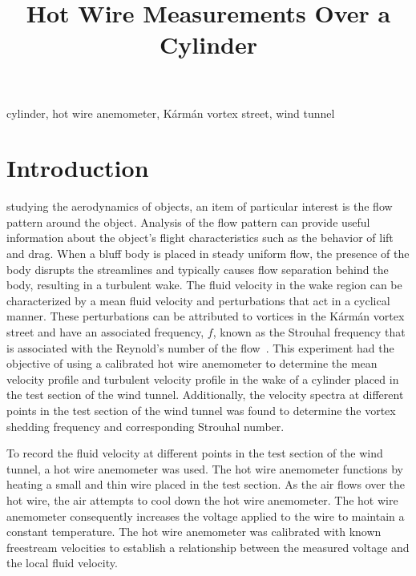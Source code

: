 \documentclass[journal,letterpaper]{IEEEtran}
\begin{document}
\title{Hot Wire Measurements Over a Cylinder}

\author{
}

\maketitle
\thispagestyle{empty}

\begin{abstract}

\end{abstract}

\begin{IEEEkeywords}
cylinder, hot wire anemometer, Kármán vortex street, wind tunnel
\end{IEEEkeywords}


\section{Introduction}


 studying the aerodynamics of objects, an item of particular interest is the flow pattern around the object.
Analysis of the flow pattern can provide useful information about the object's flight characteristics such as the behavior of lift and drag.
When a bluff body is placed in steady uniform flow, the presence of the body disrupts the streamlines and typically causes flow separation behind the body, resulting in a turbulent wake.
The fluid velocity in the wake region can be characterized by a mean fluid velocity and perturbations that act in a cyclical manner.
These perturbations can be attributed to vortices in the Kármán vortex street and have an associated frequency, $f$, known as the Strouhal frequency that is associated with the Reynold's number of the flow~\cite{Strouhal}.
This experiment had the objective of using a calibrated hot wire anemometer to determine the mean velocity profile and turbulent velocity profile in the wake of a cylinder placed in the test section of the wind tunnel.
Additionally, the velocity spectra at different points in the test section of the wind tunnel was found to determine the vortex shedding frequency and corresponding Strouhal number.

To record the fluid velocity at different points in the test section of the wind tunnel, a hot wire anemometer was used.
The hot wire anemometer functions by heating a small and thin wire placed in the test section.
As the air flows over the hot wire, the air attempts to cool down the hot wire anemometer.
The hot wire anemometer consequently increases the voltage applied to the wire to maintain a constant temperature.
The hot wire anemometer was calibrated with known freestream velocities to establish a relationship between the measured voltage and the local fluid velocity.
\end{document}
